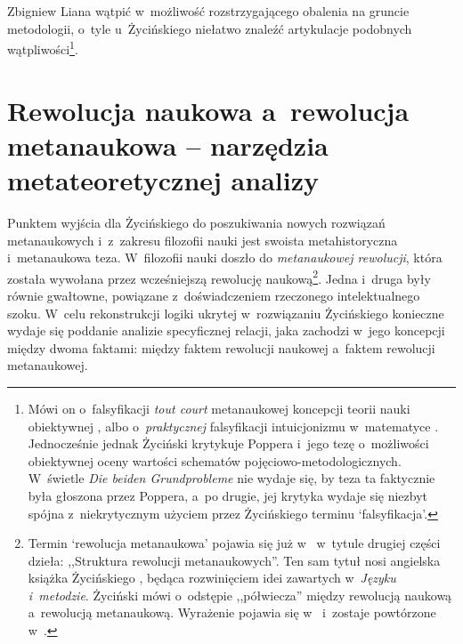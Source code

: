 \begin{artplenv}{Zbigniew Liana}
wątpić w~możliwość rozstrzygającego obalenia na gruncie metodologii, o~tyle u~Życińskiego niełatwo znaleźć artykulacje
podobnych wątpliwości\footnote{\label{lia-foo-12}Mówi on o~falsyfikacji \textit{tout court} metanaukowej koncepcji teorii nauki
obiektywnej
\parencites[s.~9]{zycinski_structure_1988}[s.~17]{zycinski_struktura_2013},
albo o~\textit{praktycznej} falsyfikacji
intuicjonizmu w~matematyce
\parencites[s.~97]{zycinski_structure_1988}[s.~174]{zycinski_struktura_2013}.
Jednocześnie jednak Życiński
\parencites*[s.~140]{zycinski_structure_1988}[s.~248]{zycinski_struktura_2013}
krytykuje Poppera i~jego tezę o~możliwości obiektywnej
oceny wartości schematów pojęciowo-metodologicznych. W~świetle \textit{Die beiden Grundprobleme} nie wydaje się, by teza
ta faktycznie była głoszona przez Poppera, a~po drugie, jej krytyka wydaje się niezbyt spójna z~niekrytycznym użyciem
przez Życińskiego terminu `falsyfikacja'.}.

\section{Rewolucja naukowa a~rewolucja metanaukowa -- narzędzia metateoretycznej analizy}

Punktem wyjścia dla Życińskiego do poszukiwania nowych rozwiązań metanaukowych i~z~zakresu filozofii nauki jest swoista
metahistoryczna i~metanaukowa teza. W~filozofii nauki doszło do \textit{metanaukowej rewolucji}, która została wywołana
przez wcześniejszą rewolucję naukową\footnote{Termin `rewolucja metanaukowa' pojawia się już
w~\parencite[s.~99]{zycinski_jezyk_1983}
w~tytule drugiej części dzieła: ,,Struktura rewolucji
metanaukowych''. Ten sam tytuł nosi angielska książka Życińskiego
\parencite*{zycinski_structure_1988},
będąca rozwinięciem
idei zawartych w~\textit{Języku i~metodzie}. Życiński mówi o~odstępie ,,półwiecza'' między rewolucją naukową a~rewolucją
metanaukową. Wyrażenie pojawia się
w~\parencite[s.~101]{zycinski_jezyk_1983}
i~zostaje powtórzone w~\parencite[s.~126]{zycinski_elementy_1996}.
}.
Jedna i~druga były
równie gwałtowne, powiązane z~doświadczeniem rzeczonego intelektualnego szoku. W~celu rekonstrukcji logiki ukrytej w~rozwiązaniu
Życińskiego konieczne wydaje się poddanie analizie specyficznej relacji, jaka zachodzi w~jego koncepcji
między dwoma faktami: między faktem rewolucji naukowej a~faktem rewolucji metanaukowej.


\end{artplenv}
